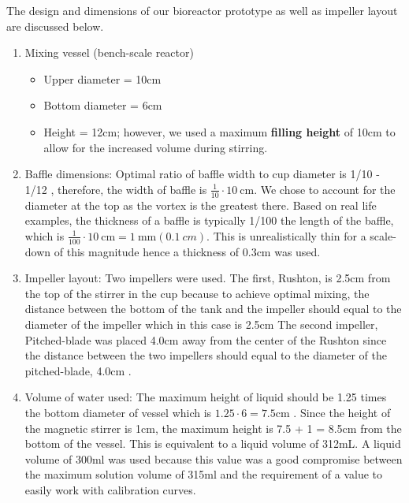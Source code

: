 The design and dimensions of our bioreactor prototype as well as impeller layout are discussed below. 
\begin{enumerate}
	\item Mixing vessel (bench-scale reactor)
	\begin{itemize}
		\item Upper diameter = 10cm
		\item Bottom diameter = 6cm
		\item Height = 12cm; however, we used a maximum \textbf{filling height} of 10cm to allow for the increased volume during stirring.
	\end{itemize}
	\item Baffle dimensions:
	Optimal ratio of baffle width to cup diameter is 1/10 - 1/12 \cite[p.258]{Doran2012}, therefore, the width of baffle is $\frac{1}{10} \cdot \SI{10}{\centi\meter}$. We chose to account for the diameter at the top as the vortex is the greatest there. Based on real life examples, the thickness of a baffle is typically 1/100 the length of the baffle, which is $ \frac{1}{100} \cdot \SI{10}{\centi\meter} = \SI{1}{\milli\meter} (\SI{0.1}{cm})$. This is unrealistically thin for a scale-down of this magnitude hence a thickness of 0.3cm was used.
	\item Impeller layout:
	Two impellers were used. The first, Rushton, is 2.5cm from the top of the stirrer in the cup because to achieve optimal mixing, the distance between the bottom of the tank and the impeller should equal to the diameter of the impeller which in this case is 2.5cm \cite[p.286]{Doran2012} The second impeller, Pitched-blade was placed 4.0cm away from the center of the Rushton since the distance between the two impellers should equal to the diameter of the pitched-blade, 4.0cm \cite[p.286]{Doran2012}.
	\item Volume of water used:
	The maximum height of liquid should be 1.25 times the bottom diameter of vessel which is $1.25\cdot6 = 7.5\si{\centi\meter}$ \cite[p.257]{Doran2012}. Since the height of the magnetic stirrer is 1cm, the maximum height is 7.5 + 1 = 8.5cm from the bottom of the vessel. This is equivalent to a liquid volume of 312mL. A liquid volume of 300ml was used because this value was a good compromise between the maximum solution volume of 315ml and the requirement of a value to easily work with calibration curves. 
\end{enumerate}